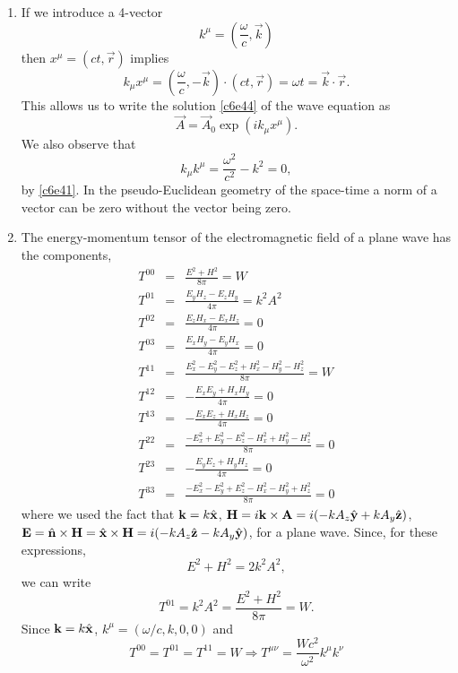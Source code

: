 \begin{enumerate}
\item If we introduce a 4-vector
\begin{equation}\label{c6e54}
k^\mu = \left(\frac{\omega}{c}, \vec{k}\right)
\end{equation}
then $x^\mu = (ct, \vec{r})$ implies
\begin{equation}\label{c6e55}
k_\mu x^\mu = \left(\frac{\omega}{c}, -\vec{k}\right)\cdot(ct, \vec{r})
= \omega t =\vec{k}\cdot\vec{r}.
\end{equation}
This allows us to write the solution \eqref{c6e44} of the wave equation as 
\begin{equation}\label{c6e56}
\vec{A} = \vec{A}_0\exp(ik_\mu x^\mu).
\end{equation}
We also observe that
\begin{equation}\label{c6e57}
k_\mu k^\mu = \frac{\omega^2}{c^2} - k^2 = 0,
\end{equation}
by \eqref{c6e41}. In the pseudo-Euclidean geometry of the space-time a norm of a
vector can be zero without the vector being zero.

\item The energy-momentum tensor of the electromagnetic field of a plane wave has
the components,
\begin{eqnarray*}
T^{00} &=& \frac{E^2 + H^2}{8\pi} = W \\
T^{01} &=& \frac{E_yH_z - E_zH_y}{4\pi} = k^2A^2\\
T^{02} &=& \frac{E_zH_x - E_xH_z}{4\pi} = 0 \\
T^{03} &=& \frac{E_xH_y - E_yH_x}{4\pi} = 0 \\
T^{11} &=& \frac{E_x^2 - E_y^2 - E_z^2 + H_x^2 - H_y^2 - H_z^2}{8\pi} = W \\
T^{12} &=& -\frac{E_xE_y + H_xH_y}{4\pi} = 0\\
T^{13} &=& -\frac{E_xE_z + H_xH_z}{4\pi} = 0\\
T^{22} &=& \frac{-E_x^2 + E_y^2 - E_z^2 - H_x^2 + H_y^2 - H_z^2}{8\pi} = 0\\
T^{23} &=& -\frac{E_yE_z + H_yH_z}{4\pi} = 0 \\
T^{33} &=& \frac{-E_x^2 - E_y^2 + E_z^2 - H_x^2 - H_y^2 + H_z^2}{8\pi} = 0
\end{eqnarray*}
where we used the fact that $\mathbf{k} = k\hat{\mathbf{x}}$, $\mathbf{H} = i\mathbf{k}\times\mathbf{A}
= i(-kA_z\hat{\mathbf{y}} + kA_y\hat{\mathbf{z}})$, $\mathbf{E} = \hat{\mathbf{n}}\times\mathbf{H} = \hat{\mathbf{x}}\times\mathbf{H}
= i(-kA_z\hat{\mathbf{z}} - kA_y\hat{\mathbf{y}})$, for a plane wave. Since, for these expressions,
\[
E^2 + H^2 = 2k^2A^2,
\]
we can write
\begin{equation}\label{c6e58}
T^{01} = k^2A^2 = \frac{E^2 + H^2}{8\pi} = W.
\end{equation}
Since $\mathbf{k} = k\hat{\mathbf{x}}$, $k^\mu = (\omega/c, k, 0, 0)$ and
\begin{equation}\label{c6e59}
T^{00} = T^{01} = T^{11} = W \Rightarrow T^{\mu\nu} = 
\frac{Wc^2}{\omega^2}k^\mu k^\nu
\end{equation}


\end{enumerate}
